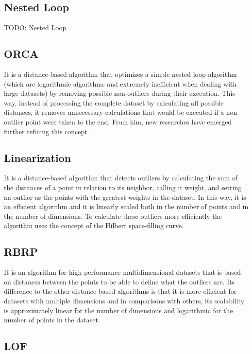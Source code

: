 \subsection{Nested Loop}

TODO: Nested Loop

\subsection{ORCA}

It is a distance-based algorithm that optimizes a simple nested loop algorithm (which are
logarithmic algorithms and extremely inefficient when dealing with large datasets) by
removing possible non-outliers during their execution. This way, instead of processing
the complete dataset by calculating all possible distances, it removes unnecessary
calculations that would be executed if a non-outlier point were taken to the end. From him,
new researches have emerged further refining this concept.

\subsection{Linearization}

It is a distance-based algorithm that detects outliers by calculating the sum of the distances
of a point in relation to its neighbor, calling it weight, and setting an outlier as the points
with the greatest weights in the dataset. In this way, it is an efficient algorithm and it is
linearly scaled both in the number of points and in the number of dimensions. To calculate these
outliers more efficiently the algorithm uses the concept of the Hilbert space-filling curve.

\subsection{RBRP}

It is an algorithm for high-performance multidimensional datasets that is based on
distances between the points to be able to define what the outliers are. Its difference
to the other distance-based algorithms is that it is more efficient for datasets with
multiple dimensions and in comparisons with others, its scalability is approximately
linear for the number of dimensions and logarithmic for the number of points in the
dataset.

\subsection{LOF}

